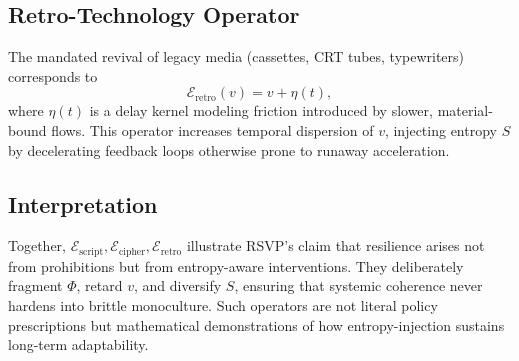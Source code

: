 \documentclass[12pt]{article}
\begin{document}
\subsection*{Retro-Technology Operator}
The mandated revival of legacy media (cassettes, CRT tubes, typewriters) corresponds to
\[
\mathcal{E}_{\text{retro}}(v) = v + \eta(t),
\]
where $\eta(t)$ is a delay kernel modeling friction introduced by slower, material-bound flows. This operator increases temporal dispersion of $v$, injecting entropy $S$ by decelerating feedback loops otherwise prone to runaway acceleration.

\subsection*{Interpretation}
Together, $\mathcal{E}_{\text{script}}, \mathcal{E}_{\text{cipher}}, \mathcal{E}_{\text{retro}}$ illustrate RSVP’s claim that resilience arises not from prohibitions but from entropy-aware interventions. They deliberately fragment $\Phi$, retard $v$, and diversify $S$, ensuring that systemic coherence never hardens into brittle monoculture. Such operators are not literal policy prescriptions but mathematical demonstrations of how entropy-injection sustains long-term adaptability.


\newpage


\end{document}
